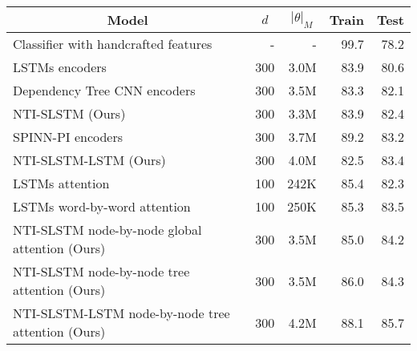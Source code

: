 \documentclass[11pt]{article}
\begin{document}
\begin{table*}[t]
\begin{center}
\small
\begin{tabular}{c|c|c|c|c}
\hline 
Model & $d$ & $|\theta|_M$ & Train	& Test \\
\hline
\multicolumn{1}{l|}{Classifier with handcrafted features \cite{bowman:15}} & \multicolumn{1}{|r|}{-} & \multicolumn{1}{|r|}{-} & \multicolumn{1}{|r|}{99.7} & \multicolumn{1}{|r}{78.2} \\
\hline
\multicolumn{1}{l|}{LSTMs encoders \cite{bowman:15}} & \multicolumn{1}{|r|}{300} & \multicolumn{1}{|r|}{3.0M} & \multicolumn{1}{|r|}{83.9} & \multicolumn{1}{|r}{80.6} \\
\multicolumn{1}{l|}{Dependency Tree CNN encoders \cite{Lili16}} & \multicolumn{1}{|r|}{300} & \multicolumn{1}{|r|}{3.5M} & \multicolumn{1}{|r|}{83.3} & \multicolumn{1}{|r}{82.1} \\
\multicolumn{1}{l|}{NTI-SLSTM (Ours)} & \multicolumn{1}{|r|}{300} & \multicolumn{1}{|r|}{3.3M} & \multicolumn{1}{|r|}{83.9} & \multicolumn{1}{|r}{82.4} \\
\multicolumn{1}{l|}{SPINN-PI encoders \cite{BowmanGRGMP16}} & \multicolumn{1}{|r|}{300} & \multicolumn{1}{|r|}{3.7M} & \multicolumn{1}{|r|}{89.2} & \multicolumn{1}{|r}{83.2} \\
\multicolumn{1}{l|}{NTI-SLSTM-LSTM (Ours)} & \multicolumn{1}{|r|}{300} & \multicolumn{1}{|r|}{4.0M} & \multicolumn{1}{|r|}{82.5} & \multicolumn{1}{|r}{83.4} \\ 
\hline
\multicolumn{1}{l|}{LSTMs attention \cite{rocktaschel:16}} & \multicolumn{1}{|r|}{100} & \multicolumn{1}{|r|}{242K} & \multicolumn{1}{|r|}{85.4} & \multicolumn{1}{|r}{82.3} \\
\multicolumn{1}{l|}{LSTMs word-by-word attention \cite{rocktaschel:16}} & \multicolumn{1}{|r|}{100} & \multicolumn{1}{|r|}{250K} & \multicolumn{1}{|r|}{85.3} & \multicolumn{1}{|r}{83.5} \\
\multicolumn{1}{l|}{NTI-SLSTM node-by-node global attention (Ours)} & \multicolumn{1}{|r|}{300} & \multicolumn{1}{|r|}{3.5M} & \multicolumn{1}{|r|}{85.0} & \multicolumn{1}{|r}{84.2} \\
\multicolumn{1}{l|}{NTI-SLSTM node-by-node tree attention (Ours)} & \multicolumn{1}{|r|}{300} & \multicolumn{1}{|r|}{3.5M} & \multicolumn{1}{|r|}{86.0} & \multicolumn{1}{|r}{84.3} \\
\multicolumn{1}{l|}{NTI-SLSTM-LSTM node-by-node tree attention (Ours)} & \multicolumn{1}{|r|}{300} & \multicolumn{1}{|r|}{4.2M} & \multicolumn{1}{|r|}{88.1} & \multicolumn{1}{|r}{85.7} \\

\end{tabular}
\end{center}
\end{table*}
\end{document}
